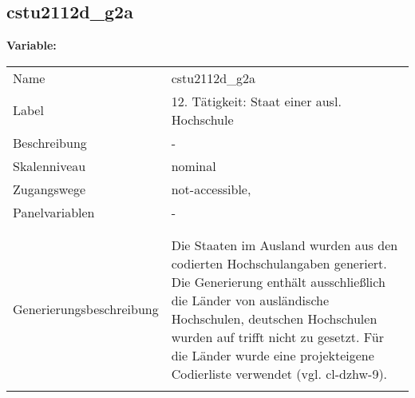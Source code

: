 	
	
	\subsection{cstu2112d\_g2a}
	\label{subSection:cstu2112d_g2a}

	\noindent\textbf{Variable:}\\
		\begin{tabular}{lL{11.3cm}}
			\label{tableVariable:cstu2112d_g2a}
			Name & cstu2112d\_g2a \\
			Label & 12. Tätigkeit: Staat einer ausl. Hochschule \\
			Beschreibung & - \\
			Skalenniveau & nominal \\
			Zugangswege &
				not-accessible,
 \\
			Panelvariablen & -
			 \\
			 \\
 \\
					Generierungsbeschreibung & Die Staaten im Ausland wurden aus den codierten Hochschulangaben generiert. Die Generierung enthält ausschließlich die Länder von ausländische Hochschulen, deutschen Hochschulen wurden auf trifft nicht zu gesetzt. Für die Länder wurde eine projekteigene Codierliste verwendet (vgl. cl-dzhw-9).
				 \\	
			 \\
		\end{tabular}






	
	\newpage

